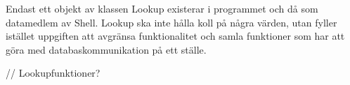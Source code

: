Endast ett objekt av klassen Lookup existerar i programmet och då som datamedlem av Shell. Lookup ska inte hålla koll på några värden, utan fyller istället uppgiften att avgränsa funktionalitet och samla funktioner som har att göra med databaskommunikation på ett ställe.

 // Lookupfunktioner?



    

